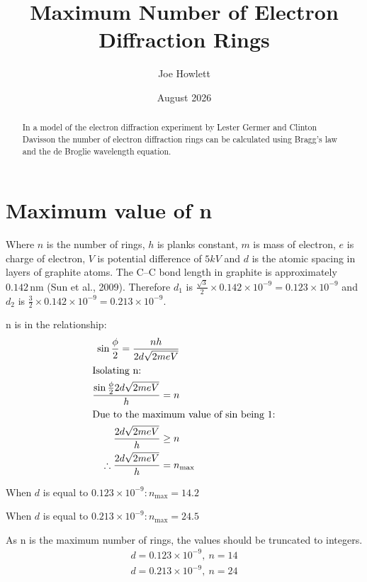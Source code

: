 \documentclass{article}
\title{Maximum Number of Electron Diffraction Rings}
\author{Joe Howlett}
\date{August 2026}
\begin{document}
\maketitle
\begin{abstract}
\noindent In a model of the electron diffraction experiment by Lester Germer and Clinton Davisson the number of electron diffraction rings can be calculated using Bragg's law and the de Broglie wavelength equation.
\end{abstract}

\section*{Maximum value of n}
\noindent Where $n$ is the number of rings, $h$ is planks constant, $m$ is mass of electron, $e$ is charge of electron, $V$ is potential difference of $5kV$ and $d$ is the atomic spacing in layers of graphite atoms. The C--C bond length in graphite is approximately
$0.142\,\mathrm{nm}$ (Sun et al., 2009). Therefore $d_{1}$ is $\frac{\sqrt{3}}{2}\times {0.142\times 10^{-9}} = 0.123\times10^{-9}${\scriptsize{}} and $d_{2}$ is $\frac{3}{2}\times {0.142\times 10^{-9}} = 0.213\times10^{-9}$.

\vspace{1em}

\noindent n is in the relationship:
\begin{align*}
\sin\frac{\phi}{2}=\frac{nh}{2d\sqrt{2 m e V}} \\
\intertext{Isolating n:}
\frac{\sin\frac{\phi}{2}{2}d\sqrt{2 m e V}}{h}=n \\
\intertext{Due to the maximum value of sin being $1$:}
\frac{{2}d\sqrt{{2}meV}}{{h}}\ge{n}& \\
\therefore \frac{{2}d\sqrt{{2}meV}}{{h}} ={n}&_{\text{max}}
\end{align*}

\noindent When $d$ is equal to $0.123\times10^{-9}: {n}_{\text{max}} = 14.2$ {\scriptsize{}}

\noindent When $d$ is equal to $0.213\times10^{-9}: {n}_{\text{max}} = 24.5$ {\scriptsize{}}

\vspace{1em}

\noindent As n is the maximum number of rings, the values should be truncated to integers.
\begin{align*}
d = 0.123\times10^{-9},\ n= 14 \\
d = 0.213\times10^{-9},\ n= 24
\end{align*}
\end{document}
